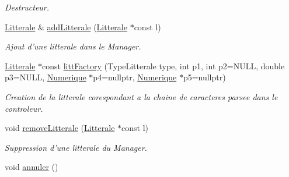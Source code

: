 \begin{CompactItemize}
\begin{CompactList}\small\item\em Destructeur. \item\end{CompactList}\item 
\hyperlink{class_litterale}{Litterale} \& \hyperlink{class_litterale_manager_bfb29c7c9e5ffdd6904f069def98d2df}{addLitterale} (\hyperlink{class_litterale}{Litterale} $\ast$const l)
\begin{CompactList}\small\item\em Ajout d'une litterale dans le Manager. \item\end{CompactList}\item 
\hyperlink{class_litterale}{Litterale} $\ast$const \hyperlink{class_litterale_manager_ac254ffc8158f21899786e2133a6018d}{littFactory} (TypeLitterale type, int p1, int p2=NULL, double p3=NULL, \hyperlink{class_numerique}{Numerique} $\ast$p4=nullptr, \hyperlink{class_numerique}{Numerique} $\ast$p5=nullptr)
\begin{CompactList}\small\item\em Creation de la litterale corespondant a la chaine de caracteres parsee dans le controleur. \item\end{CompactList}\item 
void \hyperlink{class_litterale_manager_53bfb9871eed94f6c3e8f5f1e2a76e29}{removeLitterale} (\hyperlink{class_litterale}{Litterale} $\ast$const l)
\begin{CompactList}\small\item\em Suppression d'une litterale du Manager. \item\end{CompactList}\item 
\hypertarget{class_litterale_manager_0e8fb794d0df6e0604140e325185e013}{
void \hyperlink{class_litterale_manager_0e8fb794d0df6e0604140e325185e013}{annuler} ()}
\label{class_litterale_manager_0e8fb794d0df6e0604140e325185e013}


\end{CompactItemize}
